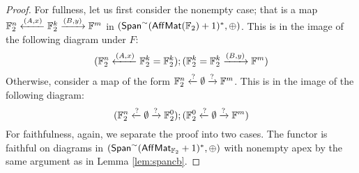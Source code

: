 \begin{proof}
For fullness, let us first consider the nonempty case; that is a map $\mathbb{F}_2^n \xleftarrow{(A,x)} \mathbb{F}_2^k \xrightarrow{(B,y)}\mathbb{F}^m$ in $(\mathsf{Span}^\sim (\mathsf{Aff}\mathsf{Mat}(\mathbb{F}_2)+1)^*,\oplus)$.  This is in the image of the following diagram under $F$:
$$
(\mathbb{F}_2^n \xleftarrow{(A,x)} \mathbb{F}_2^k  = \mathbb{F}_2^k); (\mathbb{F}_2^k = \mathbb{F}_2^k  \xrightarrow{(B,y)}\mathbb{F}^m)
$$ 
Otherwise, consider a map of the form  $\mathbb{F}_2^n \xleftarrow{?} \emptyset  \xrightarrow{?}\mathbb{F}^m$.  This is in the image of the following diagram:
$$
(\mathbb{F}_2^n \xleftarrow{?} \emptyset \xrightarrow {?} \mathbb{F}_2^0  );(\mathbb{F}_2^0 \xleftarrow{?} \emptyset  \xrightarrow{?}\mathbb{F}^m)
$$
For faithfulness, again, we separate the proof into two cases.  The functor is faithful on diagrams in $(\mathsf{Span}^\sim(\mathsf{Aff}\mathsf{Mat}_{\mathbb{F}_2}+1)^*,\oplus)$ with nonempty apex by the same argument as in Lemma \ref{lem:spancb}.

\end{proof}
